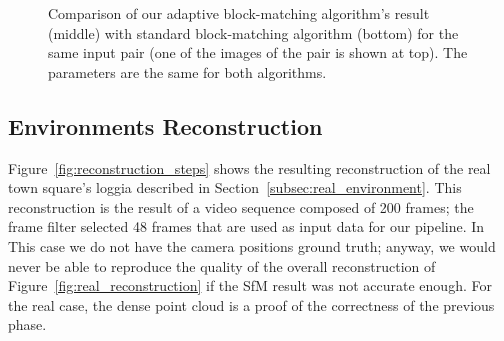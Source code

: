 \begin{figure}[h]
\begin{subfigure}{0.6\linewidth}
	\end{subfigure}
\caption{Comparison of our adaptive block-matching algorithm's result (middle) with
standard block-matching algorithm (bottom) for the same input pair (one of the
images of the pair is shown at top). The parameters are the same for
both algorithms.}
\label{fig:disparity_comparison}
\end{figure}
%
\subsection{Environments Reconstruction}
Figure~\ref{fig:reconstruction_steps} shows the resulting reconstruction of the
real town square's loggia described in Section~\ref{subsec:real_environment}.
This reconstruction is the result of a video sequence composed of 200 frames;
the frame filter selected 48 frames that are used as input data for our
pipeline.
In This case we do not have the camera positions ground truth; anyway, we
would never be able to reproduce the
quality of the overall reconstruction of Figure~\ref{fig:real_reconstruction}
if the SfM result was not accurate enough. For the real case, the dense point
cloud is a proof of the correctness of the previous phase.
%
